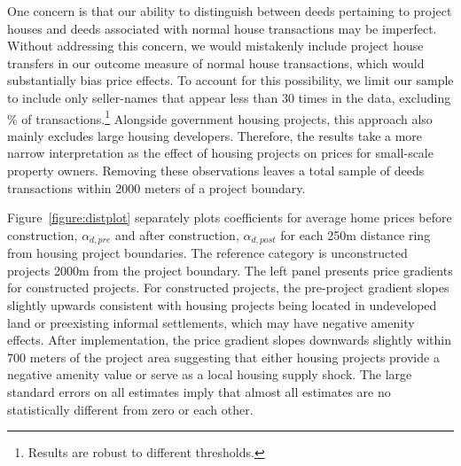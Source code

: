 \documentclass[12pt]{article}
\begin{document}
One concern is that our ability to distinguish between deeds pertaining to project houses and deeds associated with normal house transactions may be imperfect.  Without addressing this concern, we would mistakenly include project house transfers in our outcome measure of normal house transactions, which would substantially bias price effects.  To account for this possibility, we limit our sample to include only seller-names that appear less than 30 times in the data, excluding \unskip\% of transactions.\footnote{Results are robust to different thresholds.}  Alongside government housing projects, this approach also mainly excludes large housing developers.  Therefore, the results take a more narrow interpretation as the effect of housing projects on prices for small-scale property owners.  Removing these observations leaves a total sample of deeds transactions within 2000 meters of a project boundary.

Figure~\ref{figure:distplot} separately plots coefficients for average home prices before construction, $\alpha_{d,pre}$ and after construction, $\alpha_{d,post}$ for each 250m distance ring from housing project boundaries.  The reference category is unconstructed projects 2000m from the project boundary.  The left panel presents price gradients for constructed projects.  For constructed projects, the pre-project gradient slopes slightly upwards consistent with housing projects being located in undeveloped land or preexisting informal settlements, which may have negative amenity effects.  After implementation, the price gradient slopes downwards slightly within 700 meters of the project area suggesting that either housing projects provide a negative amenity value or serve as a local housing supply shock.  The large standard errors on all estimates imply that almost all estimates are no statistically different from zero or each other.
\end{document}
